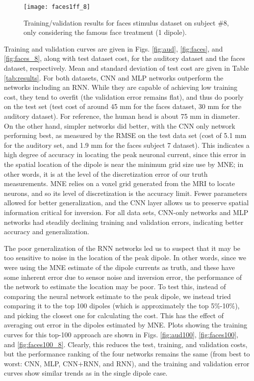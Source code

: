 \documentclass[journal,12pt,onecolumn,draftclsnofoot,]{IEEEtran}
\begin{document}
\begin{figure}[!h]
\centering
\texttt{[image: faces1ff\_8]}
\caption{Training/validation results for faces stimulus dataset on subject \#8, only considering the famous face treatment (1 dipole).}
\label{fig:faces1ff_8}
\end{figure}


Training and validation curves are given in Figs. \ref{fig:aud}, \ref{fig:faces}, and \ref{fig:faces_8}, along with test dataset cost, for the auditory dataset and the faces dataset, respectively. Mean and standard deviation of test cost are given in Table \ref{tab:results}. For both datasets, CNN and MLP networks outperform the networks including an RNN. While they are capable of achieving low training cost, they tend to overfit (the validation error remains flat), and thus do poorly on the test set (test cost of around 45 mm for the faces dataset, 30 mm for the auditory dataset). For reference, the human head is about 75 mm in diameter. On the other hand, simpler networks did better, with the CNN only network performing best, as measured by the RMSE on the test data set (cost of 5.1 mm for the auditory set, and 1.9 mm for the faces subject 7 dataset). This indicates a high degree of accuracy in locating the peak neuronal current, since this error in the spatial location of the dipole is near the minimum grid size use by MNE; in other words, it is at the level of the discretization error of our truth measurements. MNE relies on a voxel grid generated from the MRI to locate neurons, and so its level of discretization is the accuracy limit. Fewer parameters allowed for better generalization, and the CNN layer allows us to preserve spatial information critical for inversion. For all data sets, CNN-only networks and MLP networks had steadily declining training and validation errors, indicating better accuracy and generalization.

The poor generalization of the RNN networks led us to suspect that it may be too sensitive to noise in the location of the peak dipole. In other words, since we were using the MNE estimate of the dipole currents as truth, and these have some inherent error due to sensor noise and inversion error, the performance of the network to estimate the location may be poor. To test this, instead of comparing the neural network estimate to the peak dipole, we instead tried comparing it to the top 100 dipoles (which is approximately the top 5\%-10\%), and picking the closest one for calculating the cost. This has the effect of averaging out error in the dipoles estimated by MNE. Plots showing the training curves for this top-100 approach are shown in Figs. \ref{fig:aud100}, \ref{fig:faces100}, and \ref{fig:faces100_8}. Clearly, this reduces the test, training, and validation costs, but the performance ranking of the four networks remains the same (from best to worst: CNN, MLP, CNN+RNN, and RNN), and the training and validation error curves show similar trends as in the single dipole case.
\end{document}
